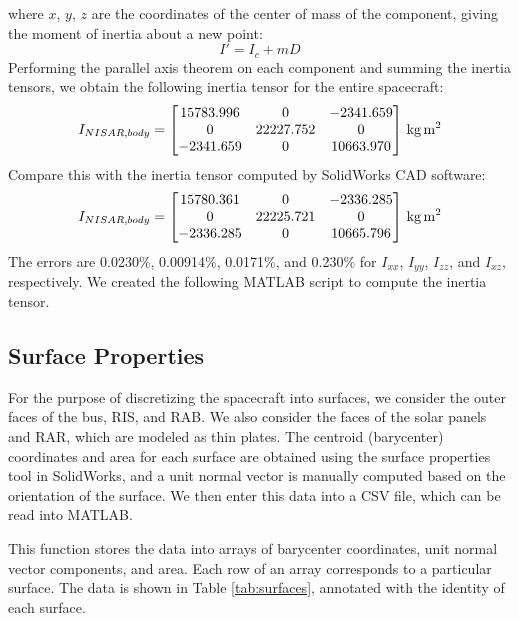 where $x$, $y$, $z$ are the coordinates of the center of mass of the component, giving the moment of inertia about a new point:
\begin{equation*}
    I' = I_{c} + mD
\end{equation*}
Performing the parallel axis theorem on each component and summing the inertia tensors, we obtain the following inertia tensor for the entire spacecraft:
\begin{equation*}
I_{NISAR,body} =
\qty[parse-numbers = false]{
\begin{bmatrix}
15783.996 & 0 & -2341.659 \\
0 & 22227.752 & 0 \\
-2341.659 & 0 & 10663.970
\end{bmatrix}
}{\kilogram\metre\squared}
\end{equation*}
Compare this with the inertia tensor computed by SolidWorks CAD software:
\begin{equation*}
I_{NISAR,body} =
\qty[parse-numbers = false]{
\begin{bmatrix}
15780.361 & 0 & -2336.285 \\
0 & 22225.721 & 0 \\
-2336.285 & 0 & 10665.796
\end{bmatrix}
}{\kilogram\metre\squared}
\end{equation*}
The errors are 0.0230\%, 0.00914\%, 0.0171\%, and 0.230\% for $I_{xx}$, $I_{yy}$, $I_{zz}$, and $I_{xz}$, respectively. We created the following MATLAB script to compute the inertia tensor.

\subsection{Surface Properties}
For the purpose of discretizing the spacecraft into surfaces, we consider the outer faces of the bus, RIS, and RAB. We also consider the faces of the solar panels and RAR, which are modeled as thin plates. The centroid (barycenter) coordinates and area for each surface are obtained using the surface properties tool in SolidWorks, and a unit normal vector is manually computed based on the orientation of the surface. We then enter this data into a CSV file, which can be read into MATLAB.

This function stores the data into arrays of barycenter coordinates, unit normal vector components, and area. Each row of an array corresponds to a particular surface. The data is shown in Table \ref{tab:surfaces}, annotated with the identity of each surface.

